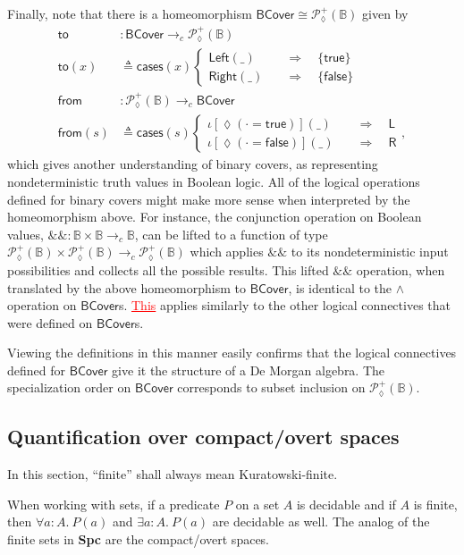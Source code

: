 \documentclass[conference]{IEEEtran}
\newcommand{\PLower}{\mathcal{P}_\lozenge}
\newcommand{\cto}{\to_c}
\newcommand{\bool}{\mathbb{B}}
\newcommand{\wildcard}{\_}
\newcommand{\oinclf}[1]{\iota[{#1}]}
\newcommand{\oincl}[2]{\oinclf{#1} \left({#2}\right)}
\newcommand{\Branch}{\Rightarrow}
\newcommand{\btrue}{\mathsf{true}}
\newcommand{\bfalse}{\mathsf{false}}
\newcommand{\BCover}{\mathsf{BCover}}
\newcommand{\grammar}[1]{\textcolor{red}{\underline{#1}}}
\begin{document}
Finally, note that there is a homeomorphism $\BCover \cong \PLower^+(\bool)$ given by
\begin{align*}
\mathsf{to} &: \BCover \cto \PLower^+(\bool)
\\ \mathsf{to}(x) &\triangleq
  \mathsf{cases}(x)
  \begin{cases}
\mathsf{Left}(\wildcard)
 \quad &\Branch \quad
 \{ \btrue \}
\\
\mathsf{Right}(\wildcard)
 \quad &\Branch \quad
 \{ \bfalse \}
  \end{cases}
\\
\mathsf{from} &: \PLower^+(\bool) \cto \BCover
\\ \mathsf{from}(s) &\triangleq
  \mathsf{cases}(s)
  \begin{cases}
 \oincl{\lozenge(\cdot = \btrue)}{\wildcard}
 \quad &\Branch \quad
 \mathsf{L}
\\
 \oincl{\lozenge(\cdot = \bfalse)}{\wildcard}
 \quad &\Branch \quad
 \mathsf{R}
  \end{cases},
\end{align*}
which gives another understanding of binary covers, as representing nondeterministic truth values in Boolean logic. All of the logical operations defined for binary covers might make more sense when interpreted by the homeomorphism above. For instance, the conjunction operation on Boolean values,
$\&\& : \bool \times \bool \cto \bool$, can be lifted to a function of type $\PLower^+(\bool) \times \PLower^+(\bool) \cto \PLower^+(\bool)$ which applies $\&\&$ to its nondeterministic input possibilities and collects all the possible results. This lifted $\&\&$ operation, when translated by the above homeomorphism to $\BCover$, is identical to the $\wedge$ operation on $\BCover$s. \grammar{This} applies similarly to the other logical connectives that were defined on $\BCover$s.

Viewing the definitions in this manner easily confirms that the logical connectives defined for $\BCover$ give it the structure of a De Morgan algebra.
The specialization order on $\BCover$ corresponds to subset inclusion on $\PLower^+(\bool)$.

\subsection{Quantification over compact/overt spaces}

In this section, ``finite'' shall always mean Kuratowski-finite.

When working with sets, if a predicate $P$ on a set $A$ is decidable and if $A$ is finite, then $\forall a : A.\ P(a)$ and $\exists a : A.\ P(a)$ are decidable as well. The analog of the finite sets in \textbf{Spc} are the compact/overt spaces.
\end{document}
